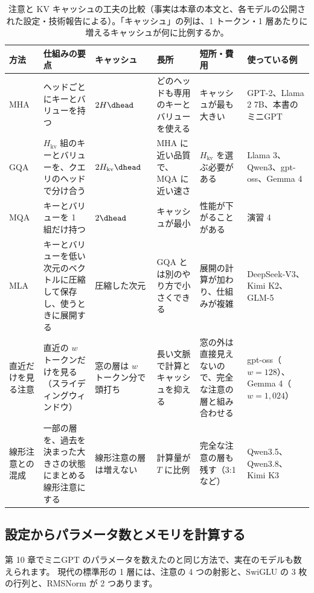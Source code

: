 \begin{table}[tbp]
\centering
\caption{注意と KV キャッシュの工夫の比較（事実は本章の本文と、各モデルの公開された設定・技術報告による）。「キャッシュ」の列は、1 トークン・1 層あたりに増えるキャッシュが何に比例するか。}
\label{tab:ma-attn}
\footnotesize
\setlength{\tabcolsep}{3pt}
\begin{tabular}{@{}>{\raggedright\arraybackslash}p{18mm}>{\raggedright\arraybackslash}p{27mm}>{\raggedright\arraybackslash}p{17mm}>{\raggedright\arraybackslash}p{19mm}>{\raggedright\arraybackslash}p{18mm}>{\raggedright\arraybackslash}p{19mm}@{}}
\toprule
方法 & 仕組みの要点 & キャッシュ & 長所 & 短所・費用 & 使っている例 \\
\midrule
MHA & ヘッドごとにキーとバリューを持つ & $2H\dhead$ & どのヘッドも専用のキーとバリューを使える & キャッシュが最も大きい & GPT-2、Llama 2 7B、本書のミニGPT \\
GQA & $H_{\mathrm{kv}}$ 組のキーとバリューを、クエリのヘッドで分け合う & $2H_{\mathrm{kv}}\dhead$ & MHA に近い品質で、MQA に近い速さ\cite{ainslie2023gqa} & $H_{\mathrm{kv}}$ を選ぶ必要がある & Llama 3、Qwen3、gpt-oss、Gemma 4 \\
MQA & キーとバリューを 1 組だけ持つ & $2\dhead$ & キャッシュが最小 & 性能が下がることがある & 演習 4 \\
MLA & キーとバリューを低い次元のベクトルに圧縮して保存し、使うときに展開する & 圧縮した次元 & GQA とは別のやり方で小さくできる & 展開の計算が加わり、仕組みが複雑 & DeepSeek-V3、Kimi K2、GLM-5 \\
直近だけを見る注意 & 直近の $w$ トークンだけを見る（スライディングウィンドウ） & 窓の層は $w$ トークン分で頭打ち & 長い文脈で計算とキャッシュを抑える & 窓の外は直接見えないので、完全な注意の層と組み合わせる & gpt-oss（$w=128$）、Gemma 4（$w=1{,}024$） \\
線形注意との混成 & 一部の層を、過去を決まった大きさの状態にまとめる線形注意にする & 線形注意の層は増えない & 計算量が $T$ に比例 & 完全な注意の層も残す（3:1 など） & Qwen3.5、Qwen3.8、Kimi K3 \\
\bottomrule
\end{tabular}
\end{table}


\subsection*{設定からパラメータ数とメモリを計算する}

第 10 章でミニGPT のパラメータを数えたのと同じ方法で、実在のモデルも数えられます。
現代の標準形の 1 層には、注意の 4 つの射影と、SwiGLU の 3 枚の行列と、RMSNorm が 2 つあります。

